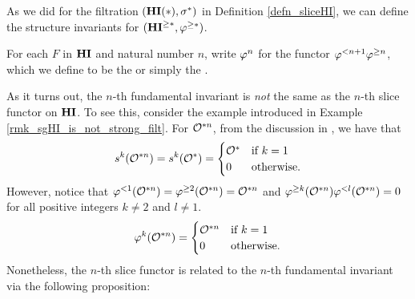 As we did for the filtration $(\mathbf{HI}(*), \sigma^{*})$ in Definition
\ref{defn_sliceHI}, we can define the structure invariants for
$(\mathbf{HI}^{\geq *}, \varphi^{\geq *})$.
\begin{defn}
For each $F$ in $\mathbf{HI}$ and natural number $n$, write $\varphi^{n}$ 
for the functor $\varphi^{< n + 1} \varphi^{\geq n}$, which we define to be the 
or simply the .
\end{defn}

As it turns out, the $n$-th fundamental invariant is \emph{not} 
the same as the $n$-th slice functor on $\mathbf{HI}$. To see this, 
consider the example introduced in Example
\ref{rmk_sgHI_is_not_strong_filt}. For $\mathcal{O}^{* n}$, from the
discussion in \loccit, we have that
\[
s^k(\mathcal{O}^{* n}) = s^k(\mathcal{O}^*) = \begin{cases}
\mathcal{O}^* &\textrm{if }k = 1\\
0   &\textrm{otherwise}.
\end{cases}
\]
However, notice that $\varphi^{< 1}(\mathcal{O}^{* n}) = \varphi^{\geq 2}(\mathcal{O}^{* n}) = \mathcal{O}^{* n}$
and $\varphi^{\geq k}(\mathcal{O}^{* n}) \varphi^{< l}(\mathcal{O}^{* n}) = 0$ for all positive integers
$k \neq 2$ and $l \neq 1$.
\[
\varphi^{k}(\mathcal{O}^{* n}) = \begin{cases}
\mathcal{O}^{* n} &\textrm{if }k = 1\\
0     &\textrm{otherwise}.
\end{cases}
\]
Nonetheless, the $n$-th slice functor is related to the $n$-th
fundamental invariant via the following proposition:

